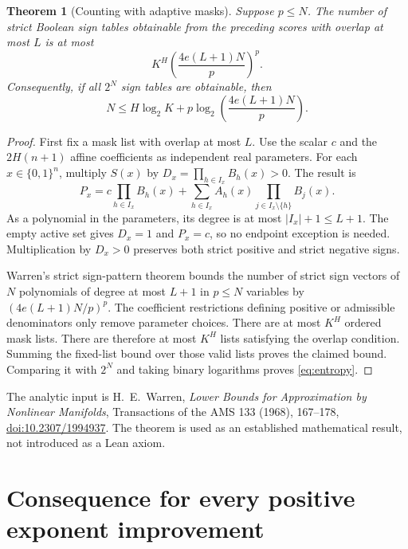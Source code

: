 \documentclass[11pt]{article}
\newtheorem{theorem}{Theorem}
\newcommand{\Qn}{\{0,1\}^n}
\begin{document}
\begin{theorem}[Counting with adaptive masks]\label{thm:count}
Suppose $p\leq N$. The number of strict Boolean sign tables obtainable
from the preceding scores with overlap at most $L$ is at most
\[
 K^H\left(\frac{4e(L+1)N}{p}\right)^p.
\]
Consequently, if all $2^N$ sign tables are obtainable, then
\[
 N\leq H\log_2 K+
 p\log_2\left(\frac{4e(L+1)N}{p}\right).
 \tag{1}\label{eq:entropy}
\]
\end{theorem}
\begin{proof}
First fix a mask list with overlap at most $L$. Use the scalar $c$
and the $2H(n+1)$ affine coefficients as independent real parameters.
For each $x\in\Qn$, multiply $S(x)$ by
$D_x=\prod_{h\in I_x}B_h(x)>0$. The result is
\[
 P_x=c\prod_{h\in I_x}B_h(x)+
 \sum_{h\in I_x}A_h(x)
       \prod_{j\in I_x\setminus\{h\}}B_j(x).
 \tag{2}\label{eq:cleared}
\]
As a polynomial in the parameters, its degree is at most
$|I_x|+1\leq L+1$. The empty active set gives $D_x=1$ and $P_x=c$,
so no endpoint exception is needed. Multiplication by $D_x>0$
preserves both strict positive and strict negative signs.

Warren's strict sign-pattern theorem bounds the number of strict
sign vectors of $N$ polynomials of degree at most $L+1$ in $p\leq N$
variables by $(4e(L+1)N/p)^p$. The coefficient restrictions defining
positive or admissible denominators only remove parameter choices.
There are at most $K^H$ ordered mask lists. There are therefore at most $K^H$ lists satisfying the overlap
condition. Summing the fixed-list bound over those valid lists proves
the claimed bound. Comparing it with $2^N$ and taking binary
logarithms proves \eqref{eq:entropy}.
\end{proof}

The analytic input is H.~E.~Warren,
\emph{Lower Bounds for Approximation by Nonlinear Manifolds},
Transactions of the AMS 133 (1968), 167--178,
\href{https://doi.org/10.2307/1994937}{doi:10.2307/1994937}.
The theorem is used as an established mathematical result, not introduced
as a Lean axiom.

\section{Consequence for every positive exponent improvement}
\end{document}
